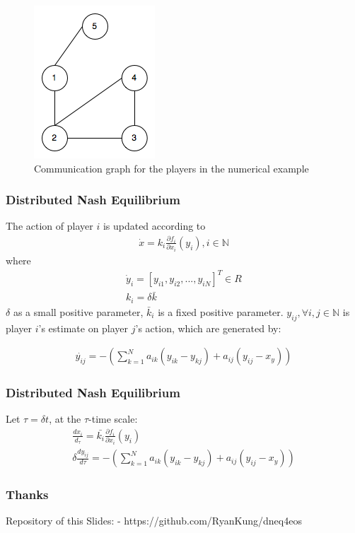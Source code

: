 \documentclass[notheorems, aspectratio=54]{beamer}
\begin{document}
\begin{frame}
  \begin{figure}[H]
    \centering
    \includegraphics[width=0.3\linewidth]{nodes.png}
    \caption{Communication graph for the players in the numerical example}
  \end{figure}
\end{frame}

\begin{frame}
  \frametitle{Distributed Nash Equilibrium}

  The action of player $i$ is updated according to\newline
  \begin{gather}
    \dot{x} = k_i \frac {\partial f_i}{\partial x_i}(y_i), i \in \mathbb{N} 
  \end{gather}
  where
   \begin{gather}
     \dot{y}_i = [y_{i1}, y_{i2},...,y_{iN}]^T \in R \nonumber \\
     k_i = \delta \bar{k} \nonumber
   \end{gather}
   $\delta$ as a small positive parameter, $\bar{k}_i$ is a fixed positive parameter.\newline
   $y_{ij}, \forall i, j \in \mathbb{N}$ is player $i$'s estimate on player $j$'s action, which are generated by:\newline

   \begin{gather}
     \dot{y_{ij}}=-\left(\sum_{k=1}^N a_{ik}(y_{ik}-y_{kj})+a_{ij}(y_{ij}-x_y)\right) \nonumber
   \end{gather}

\end{frame}

\begin{frame}
  \frametitle{Distributed Nash Equilibrium}
  Let $\tau=\delta t$, at the $\tau$-time scale:\newline
  \begin{gather}
    \frac{dx_i}{d_{\tau}}=\bar{k_i}\frac{\partial f_i}{\partial x_i}(y_i)\nonumber\\
    \delta \frac{dy_{ij}}{d\tau}=-\left(\sum_{k=1}^N a_{ik}(y_{ik}-y_{kj})+a_{ij}(y_{ij}-x_y)\right) 
  \end{gather}

\end{frame}


\begin{frame}
  \frametitle{Thanks}
  Repository of this Slides:\newline
  - https://github.com/RyanKung/dneq4eos \quad
\end{frame}
\end{document}
